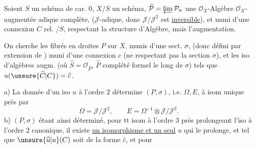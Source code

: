 \uline{} Soient $S$ un schéma de car. $0$, $X/S$ un schéma, $\widehat{\mathcal P}=\varprojlim\mathcal P_n$ une  $\mathcal O_X$-Algèbre $\mathcal O_X$-augmentée adique complète,  ($\mathcal J$-adique,  donc $\mathcal J/\mathcal J^2$ \deleted{$\unsure{\simeq\Omega}$} est \uline{inversible}), et muni d'une \deleted{$\unsure{\xi}$} connexion  $C$ rel. $/S$, respectant la structure d'Algèbre, mais  l'augmentation.

On cherche les fibrés en droites $P$ sur $X$, munis d'une sect. $\sigma$, (donc défini par extension de 
) muni d'une connexion $c$ (ne respectant pas  la section  $\sigma$),  et les iso d'algèbres augm.
 (où $\widehat S=\mathcal O_{\widehat P}$, $\widehat P$ complété formel le long de $\sigma$) tels que $u(\unsure{\widehat C|C})=\widehat c$.

a) La donnée d'un iso $u$ à l'ordre $2$ détermine $(P,\sigma)$, i.e. $\Omega,E$, à isom unique près par
\[
\Omega=\mathcal J/\mathcal J^2,\qquad E=\Omega^{-1}\otimes\mathcal J/\mathcal J^3.
\]
b) $(P,\sigma)$ étant ainsi déterminé, pour tt isom  à l'ordre $3$ près
prolongeant l'iso à l'ordre $2$ canonique, il existe \uline{un isomorphisme et un seul} $u$ qui le prolonge, et tel que $\unsure{\widehat u|u}(C)$ soit de la forme $\widehat c$, et pour 
